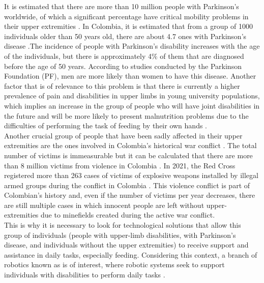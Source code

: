 \documentclass[11pt]{report} %
\begin{document}
It is estimated that there are more than 10 million people with Parkinson's worldwide, of which a significant percentage have critical mobility problems in their upper extremities \citep{cite_parkinson_foundation_total_cases}. In Colombia, it is estimated that from a group of 1000 individuals older than 50 years old, there are about 4.7 ones with Parkinson's disease \citep{cite_parkinson_total_people_colombia}.The incidence of people with Parkinson's disability increases with the age of the individuals, but there is approximately 4\% of them that are diagnosed before the age of 50 years. According to studies conducted by the Parkinson Foundation (PF), men are more likely than women to have this disease. Another factor that is of relevance to this problem is that there is currently a higher prevalence of pain and disabilities in upper limbs in young university populations, which implies an increase in the group of people who will have joint disabilities in the future and will be more likely to present malnutrition problems due to the difficulties of performing the task of feeding by their own hands \citep{cite_park_active_robot_assisted_feeding}.\\

Another crucial group of people that have been sadly affected in their upper extremities are the ones involved in Colombia's historical war conflict \citep{cite_colombia_war_conflict_explained}. The total number of victims is immeasurable but it can be calculated that there are more than 8 million victims from violence in Colombia \citep{cite_colombia_war_victims}. In 2021, the Red Cross registered more than 263 cases of victims of explosive weapons installed by illegal armed groups during the conflict in Colombia \citep{cite_people_affected_from_minefields_colombia}. This violence conflict is part of Colombian's history and, even if the number of victims per year decreases, there are still multiple cases in which innocent people are left without upper-extremities due to minefields created during the active war conflict.\\

This is why it is necessary to look for technological solutions that allow this group of individuals (people with upper-limb disabilities, with Parkinson's disease, and individuals without the upper extremities) to receive support and assistance in daily tasks, especially feeding. Considering this context, a branch of robotics known as  is of interest, where robotic systems seek to support individuals with disabilities to perform daily tasks \citep{cite_assited_robotics_stanford_lecture_jaffe}.\\
\end{document}
